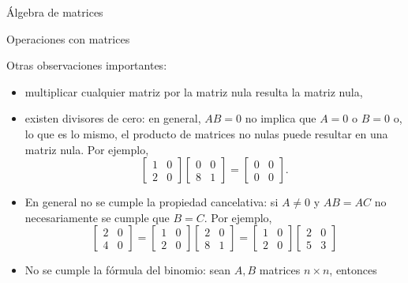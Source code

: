 \begin{chapter}{\'Algebra de matrices}
\begin{section}{Operaciones con matrices}
\begin{observacion}
                \end{observacion}

                Otras observaciones importantes: 
                
                \begin{itemize}
                    \item multiplicar cualquier matriz por la matriz nula resulta la matriz nula,
                    \item existen divisores de cero: en general, $AB = 0$ no implica que $A = 0$ o $B = 0$  o,  lo que es lo mismo, el producto de matrices no nulas puede resultar en una matriz nula. Por
                    ejemplo,
                    \begin{equation*}
                    \begin{bmatrix}1&0\\2&0\end{bmatrix} \begin{bmatrix}0&0\\8&1\end{bmatrix} = \begin{bmatrix}0&0\\0&0\end{bmatrix}.
                    \end{equation*}
                    \item En general no se cumple la propiedad cancelativa: si $A\not=0$ y  $AB = AC$ no necesariamente se cumple que $B = C$. Por
                    ejemplo,
                    \begin{equation*}
                    \begin{bmatrix}2&0\\4&0\end{bmatrix}=
                    \begin{bmatrix}1&0\\2&0\end{bmatrix} \begin{bmatrix}2&0\\8&1\end{bmatrix} =
                    \begin{bmatrix}1&0\\2&0\end{bmatrix} \begin{bmatrix}2&0\\5&3\end{bmatrix}
                    \end{equation*}
                    \item No se cumple la fórmula del binomio:     sean $A, B$ matrices $n \times n$, entonces        

\end{itemize}
\end{section}
\end{chapter}
